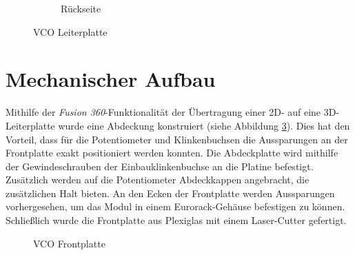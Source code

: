 \begin{figure}[h]
\begin{subfigure}{.5\textwidth}
		\caption{Rückseite}
		\label{fig:VCO_Back}
	\end{subfigure}
	\caption{VCO Leiterplatte}
	\label{fig:VCO Leiterplatte}
\end{figure}


\newpage
\section{Mechanischer Aufbau}
Mithilfe der \textit{Fusion 360}-Funktionalität der Übertragung einer 2D- auf eine 3D-Leiterplatte wurde eine Abdeckung konstruiert (siehe Abbildung \ref{fig:VCO Frontplattemit 3D-Leiterplatte}).
Dies hat den Vorteil, dass für die Potentiometer und Klinkenbuchsen die Aussparungen an der Frontplatte exakt positioniert werden konnten.
Die Abdeckplatte wird mithilfe der Gewindeschrauben der Einbauklinkenbuchse an die Platine befestigt.
Zusätzlich werden auf die Potentiometer Abdeckkappen angebracht, die zusätzlichen Halt bieten.
An den Ecken der Frontplatte werden Aussparungen vorhergesehen, um das Modul in einem Eurorack-Gehäuse befestigen zu können.
Schließlich wurde die Frontplatte aus Plexiglas mit einem Laser-Cutter gefertigt.

\begin{figure}[h]
	\centering
	\setlength{\fboxsep}{1pt} %
	\setlength{\fboxrule}{1pt} %
	\caption{VCO Frontplatte}
	\label{fig:VCO Frontplattemit 3D-Leiterplatte}
\end{figure}